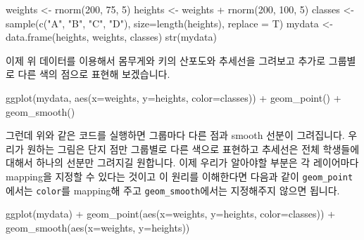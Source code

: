 \documentclass[
]{book}
\newenvironment{Shaded}{\begin{snugshade}}{\end{snugshade}}
\newcommand{\AttributeTok}[1]{\textcolor[rgb]{0.77,0.63,0.00}{#1}}
\newcommand{\DecValTok}[1]{\textcolor[rgb]{0.00,0.00,0.81}{#1}}
\newcommand{\FunctionTok}[1]{\textcolor[rgb]{0.00,0.00,0.00}{#1}}
\newcommand{\NormalTok}[1]{#1}
\newcommand{\OtherTok}[1]{\textcolor[rgb]{0.56,0.35,0.01}{#1}}
\newcommand{\SpecialCharTok}[1]{\textcolor[rgb]{0.00,0.00,0.00}{#1}}
\newcommand{\StringTok}[1]{\textcolor[rgb]{0.31,0.60,0.02}{#1}}
\begin{document}
\begin{Shaded}
\begin{Highlighting}[]
\NormalTok{weights }\OtherTok{\textless{}{-}} \FunctionTok{rnorm}\NormalTok{(}\DecValTok{200}\NormalTok{, }\DecValTok{75}\NormalTok{, }\DecValTok{5}\NormalTok{)}
\NormalTok{heights }\OtherTok{\textless{}{-}}\NormalTok{ weights }\SpecialCharTok{+} \FunctionTok{rnorm}\NormalTok{(}\DecValTok{200}\NormalTok{, }\DecValTok{100}\NormalTok{, }\DecValTok{5}\NormalTok{)}
\NormalTok{classes }\OtherTok{\textless{}{-}} \FunctionTok{sample}\NormalTok{(}\FunctionTok{c}\NormalTok{(}\StringTok{"A"}\NormalTok{, }\StringTok{"B"}\NormalTok{, }\StringTok{"C"}\NormalTok{, }\StringTok{"D"}\NormalTok{), }\AttributeTok{size=}\FunctionTok{length}\NormalTok{(heights), }\AttributeTok{replace =}\NormalTok{ T)}
\NormalTok{mydata }\OtherTok{\textless{}{-}} \FunctionTok{data.frame}\NormalTok{(heights, weights, classes)}
\FunctionTok{str}\NormalTok{(mydata)}
\end{Highlighting}
\end{Shaded}

이제 위 데이터를 이용해서 몸무게와 키의 산포도와 추세선을 그려보고 추가로 그룹별로 다른 색의 점으로 표현해 보겠습니다.

\begin{Shaded}
\begin{Highlighting}[]
\FunctionTok{ggplot}\NormalTok{(mydata, }\FunctionTok{aes}\NormalTok{(}\AttributeTok{x=}\NormalTok{weights, }\AttributeTok{y=}\NormalTok{heights, }\AttributeTok{color=}\NormalTok{classes)) }\SpecialCharTok{+}
  \FunctionTok{geom\_point}\NormalTok{() }\SpecialCharTok{+}
  \FunctionTok{geom\_smooth}\NormalTok{()}
\end{Highlighting}
\end{Shaded}

그런데 위와 같은 코드를 실행하면 그룹마다 다른 점과 smooth 선분이 그려집니다. 우리가 원하는 그림은 단지 점만 그룹별로 다른 색으로 표현하고 추세선은 전체 학생들에 대해서 하나의 선분만 그려지길 원합니다. 이제 우리가 알아야할 부분은 각 레이어마다 mapping을 지정할 수 있다는 것이고 이 원리를 이해한다면 다음과 같이 \texttt{geom\_point}에서는 \texttt{color}를 mapping해 주고 \texttt{geom\_smooth}에서는 지정해주지 않으면 됩니다.

\begin{Shaded}
\begin{Highlighting}[]
\FunctionTok{ggplot}\NormalTok{(mydata) }\SpecialCharTok{+}
  \FunctionTok{geom\_point}\NormalTok{(}\FunctionTok{aes}\NormalTok{(}\AttributeTok{x=}\NormalTok{weights, }\AttributeTok{y=}\NormalTok{heights, }\AttributeTok{color=}\NormalTok{classes)) }\SpecialCharTok{+}
  \FunctionTok{geom\_smooth}\NormalTok{(}\FunctionTok{aes}\NormalTok{(}\AttributeTok{x=}\NormalTok{weights, }\AttributeTok{y=}\NormalTok{heights))}
\end{Highlighting}
\end{Shaded}
\end{document}
